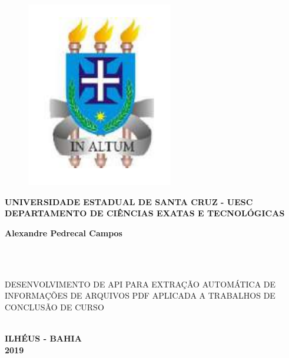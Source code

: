 \thispagestyle{empty}

\vfill
 \begin{center}

    \begin{figure}
	   \centering
	   		\includegraphics[scale=0.35]{figs/brasao_uesc.png}
    \end{figure}

    {\large\bfseries UNIVERSIDADE ESTADUAL DE SANTA CRUZ - UESC} \\


    {\large\bfseries DEPARTAMENTO DE CIÊNCIAS EXATAS E TECNOLÓGICAS}  \\

    \vspace*{1in}
    \begin{large} \bfseries Alexandre Pedrecal Campos \end{large}\\[0.4in]

    \vspace*{4cm}
    \noindent \\

    \large\bfseries{\begin{large}DESENVOLVIMENTO DE API PARA EXTRAÇÃO AUTOMÁTICA DE INFORMAÇÕES DE ARQUIVOS PDF APLICADA A TRABALHOS DE CONCLUSÃO DE CURSO\end{large}} \\
    \vfill
    \large\bfseries{ ILHÉUS - BAHIA \\ 2019}
\end{center}

\normalsize


